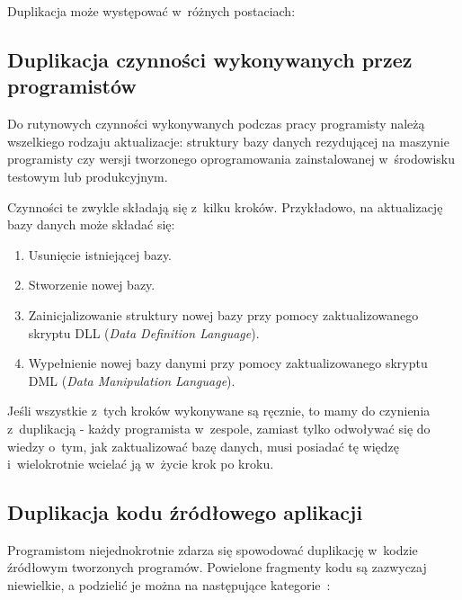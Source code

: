 Duplikacja może występować w~różnych postaciach:


\subsection{Duplikacja czynności wykonywanych przez programistów} \label{sec:tasks_dupl}

Do rutynowych czynności wykonywanych podczas pracy programisty należą wszelkiego rodzaju aktualizacje: struktury bazy danych rezydującej na maszynie programisty czy wersji tworzonego oprogramowania zainstalowanej w~środowisku testowym lub produkcyjnym.

Czynności te zwykle składają się z~kilku kroków. Przykładowo, na aktualizację bazy danych może składać się:

\begin{enumerate}
 \item Usunięcie istniejącej bazy.
 \item Stworzenie nowej bazy.
 \item Zainicjalizowanie struktury nowej bazy przy pomocy zaktualizowanego skryptu DLL (\emph{Data Definition Language}).
 \item Wypełnienie nowej bazy danymi przy pomocy zaktualizowanego skryptu DML (\emph{Data Manipulation Language}).
\end{enumerate}

Jeśli wszystkie z~tych kroków wykonywane są ręcznie, to mamy do czynienia z~duplikacją - każdy programista w~zespole, zamiast tylko odwoływać się do wiedzy o~tym, jak zaktualizować bazę danych, musi posiadać tę więdzę i~wielokrotnie wcielać ją w~życie krok po kroku.


\subsection{Duplikacja kodu źródłowego aplikacji} \label{sec:code_dupl_kinds}

Programistom niejednokrotnie zdarza się spowodować duplikację w~kodzie źródłowym tworzonych programów.
Powielone fragmenty kodu są zazwyczaj niewielkie, a podzielić je można na następujące kategorie~\cite{soft_sol_dupl}:

